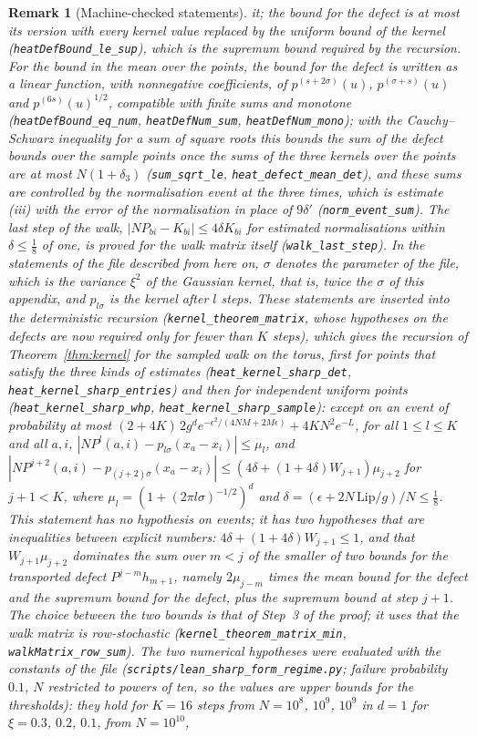 \documentclass[11pt,a4paper]{article}
\theoremstyle{stmt}
\theoremstyle{defn}
\theoremstyle{rmk}
\newtheorem{remark}[theorem]{Remark}
\numberwithin{equation}{section}
\begin{document}
{\begin{remark}[Machine-checked statements]
it; the bound for the defect is at most its version with every kernel value replaced by the uniform bound of the kernel (\texttt{heatDefBound\_le\_sup}), which is the supremum bound required by the recursion. For the bound in the mean over the points, the bound for the defect is written as a linear function, with nonnegative coefficients, of $p^{(s+2\sigma)}(u)$, $p^{(\sigma+s)}(u)$ and $p^{(6s)}(u)^{1/2}$, compatible with finite sums and monotone (\texttt{heatDefBound\_eq\_num}, \texttt{heatDefNum\_sum}, \texttt{heatDefNum\_mono}); with the Cauchy--Schwarz inequality for a sum of square roots this bounds the sum of the defect bounds over the sample points once the sums of the three kernels over the points are at most $N(1+\delta_3)$ (\texttt{sum\_sqrt\_le}, \texttt{heat\_defect\_mean\_det}), and these sums are controlled by the normalisation event at the three times, which is estimate (iii) with the error of the normalisation in place of $9\delta'$ (\texttt{norm\_event\_sum}). The last step of the walk, $|NP_{bi}-K_{bi}|\le4\delta K_{bi}$ for estimated normalisations within $\delta\le\frac18$ of one, is proved for the walk matrix itself (\texttt{walk\_last\_step}). In the statements of the file described from here on, $\sigma$ denotes the parameter of the file, which is the variance $\xi^2$ of the Gaussian kernel, that is, twice the $\sigma$ of this appendix, and $p_{l\sigma}$ is the kernel after $l$ steps. These statements are inserted into the deterministic recursion (\texttt{kernel\_theorem\_matrix}, whose hypotheses on the defects are now required only for fewer than $K$ steps), which gives the recursion of Theorem~\ref{thm:kernel} for the sampled walk on the torus, first for points that satisfy the three kinds of estimates (\texttt{heat\_kernel\_sharp\_det}, \texttt{heat\_kernel\_sharp\_entries}) and then for independent uniform points (\texttt{heat\_kernel\_sharp\_whp}, \texttt{heat\_kernel\_sharp\_sample}): except on an event of probability at most $(2+4K)\,2g^de^{-\epsilon^2/(4NM+2M\epsilon)}+4KN^2e^{-L}$, for all $1\le l\le K$ and all $a,i$, $|NP^l(a,i)-p_{l\sigma}(x_a-x_i)|\le\mu_l$, and $|NP^{j+2}(a,i)-p_{(j+2)\sigma}(x_a-x_i)|\le(4\delta+(1+4\delta)W_{j+1})\mu_{j+2}$ for $j+1<K$, where $\mu_l=(1+(2\pi l\sigma)^{-1/2})^d$ and $\delta=(\epsilon+2N\,\mathrm{Lip}/g)/N\le\frac18$. This statement has no hypothesis on events; it has two hypotheses that are inequalities between explicit numbers: $4\delta+(1+4\delta)W_{j+1}\le1$, and that $W_{j+1}\mu_{j+2}$ dominates the sum over $m<j$ of the smaller of two bounds for the transported defect $P^{j-m}h_{m+1}$, namely $2\mu_{j-m}$ times the mean bound for the defect and the supremum bound for the defect, plus the supremum bound at step $j+1$. The choice between the two bounds is that of Step~3 of the proof; it uses that the walk matrix is row-stochastic (\texttt{kernel\_theorem\_matrix\_min}, \texttt{walkMatrix\_row\_sum}). The two numerical hypotheses were evaluated with the constants of the file (\texttt{scripts/lean\_sharp\_form\_regime.py}; failure probability $0.1$, $N$ restricted to powers of ten, so the values are upper bounds for the thresholds): they hold for $K=16$ steps from $N=10^{8}$, $10^{9}$, $10^{9}$ in $d=1$ for $\xi=0.3$, $0.2$, $0.1$, from $N=10^{10}$, 
\end{remark}}
\end{document}
